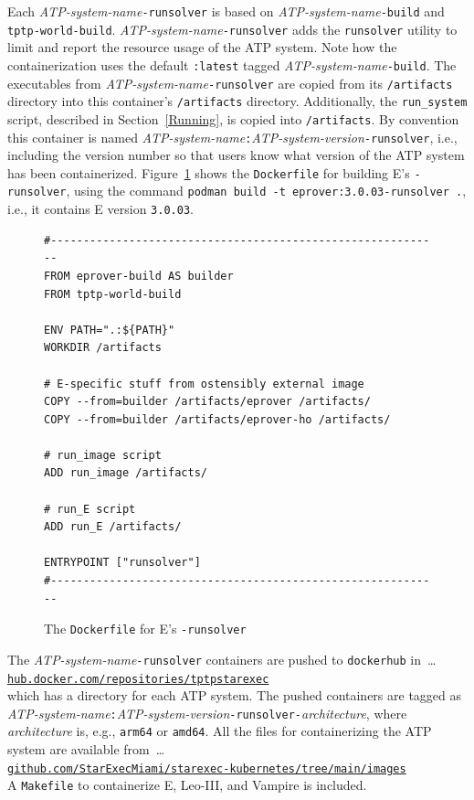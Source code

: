 \documentclass{easychair}
\begin{document}
Each {\em ATP-system-name}{\tt -runsolver} is based on {\em ATP-system-name}{\tt-build} and 
{\tt tptp-world-build}.
{\em ATP-system-name}{\tt -runsolver} adds the {\tt runsolver} utility to limit and report
the resource usage of the ATP system.
Note how the containerization uses the default {\tt :latest} tagged 
{\em ATP-system-name}{\tt-build}. 
The executables from {\em ATP-system-name}{\tt -runsolver} are copied from its 
{\tt /artifacts} directory into this container's {\tt /artifacts} directory.
Additionally, the {\tt run\_system} script, described in Section~\ref{Running}, is copied into
{\tt /artifacts}.
By convention this container is named
{\em ATP-system-name}{\tt :}{\em ATP-system-version}{\tt -runsolver}, i.e., including the version
number so that users know what version of the ATP system has been containerized.
Figure~\ref{E---runsolver} shows the {\tt Dockerfile} for building E's {\tt -runsolver},
using the command {\tt podman~build~-t~eprover:3.0.03-runsolver~.}, i.e., it contains
E version {\tt 3.0.03}.

\begin{figure}[htb]
{\small
\begin{verbatim}
#------------------------------------------------------------
FROM eprover-build AS builder
FROM tptp-world-build

ENV PATH=".:${PATH}"
WORKDIR /artifacts

# E-specific stuff from ostensibly external image
COPY --from=builder /artifacts/eprover /artifacts/
COPY --from=builder /artifacts/eprover-ho /artifacts/

# run_image script 
ADD run_image /artifacts/

# run_E script 
ADD run_E /artifacts/

ENTRYPOINT ["runsolver"]
#------------------------------------------------------------
\end{verbatim}
}
\caption{The {\tt Dockerfile} for E's {\tt -runsolver}}
\label{E---runsolver}
\end{figure}

The {\em ATP-system-name}{\tt -runsolver} containers are pushed to {\tt dockerhub} in~\ldots\\
\hspace*{1cm}\href{https://hub.docker.com/repositories/tptpstarexec}{\tt hub.docker.com/repositories/tptpstarexec}\\
which has a directory for each ATP system.
The pushed containers are tagged as 
{\em ATP-system-name}{\tt :}{\em ATP-system-version}{\tt -runsolver-}{\em architecture},
where {\em architecture} is, e.g., {\tt arm64} or {\tt amd64}.
All the files for containerizing the ATP system are available from~\ldots \\
\hspace*{1cm}\href{https://github.com/StarExecMiami/starexec-kubernetes/tree/main/images}{\tt github.com/StarExecMiami/starexec-kubernetes/tree/main/images}\\
A {\tt Makefile} to containerize E, Leo-III, and Vampire is included.
\end{document}
